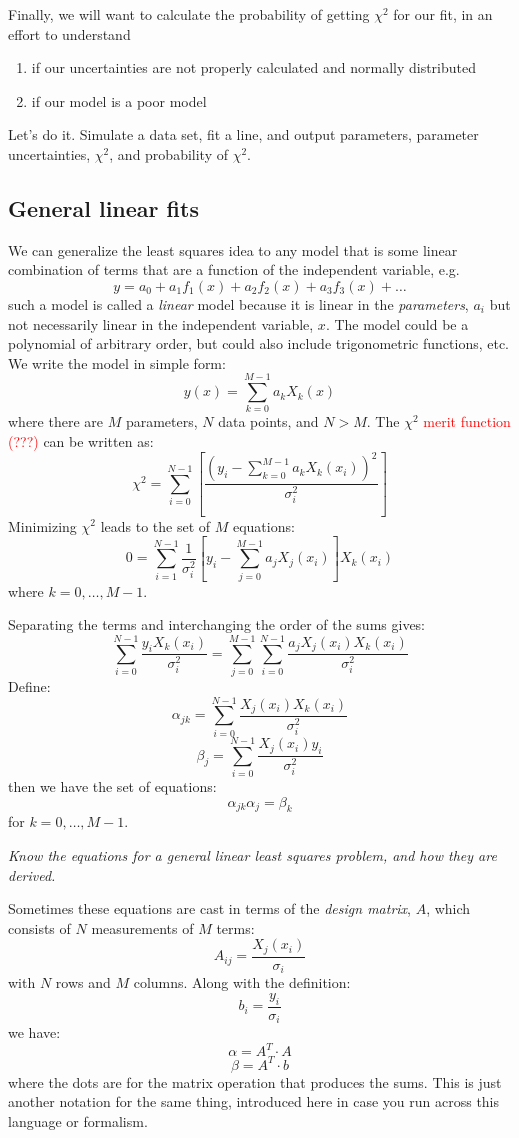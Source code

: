 \documentclass{article}
\newcommand{\test}[1]{%
    \begin{center}
        \colorbox{hl}{\parbox{0.9\textwidth}{\emph{\centering #1}}}
    \end{center}}
\begin{document}
Finally, we will want to calculate the probability of getting
$ \chi^{2}$ for our fit,
in an effort to understand
\begin{enumerate}
    \item if our uncertainties are not properly calculated and
        normally distributed
    \item if our model is a poor model
\end{enumerate}

Let's do it. Simulate a data set, fit a line, and output parameters, parameter
uncertainties, $\chi^2$, and probability of $\chi^2$.

\subsection{General linear fits}
We can generalize the least squares idea to any model that is some linear
combination of terms that are a function of the independent variable,
e.g.
$$ y = a_0 + a_1f_1(x) + a_2f_2(x) + a_3f_3(x) + \ldots
$$
such a model is called a \emph{linear} model because it is linear
in the \emph{parameters}, $a_{i}$ but not necessarily linear in the independent
variable, $x$. The model could be a polynomial of arbitrary order, but
could also include trigonometric functions, etc. We write the model
in simple form:
$$  y(x) = \sum_{k=0}^{M-1}a_kX_k(x)
$$
where there are $M$ parameters, $N$ data points, and $N>M$.
The $\chi^2$ \textcolor{red}{merit function (???)} can be written as:
$$ \chi^2 = \sum_{i=0}^{N-1} \left[
    \frac{(y_i - \sum_{k=0}^{M-1} a_{k}X_{k}(x_{i}))^{2}}
    {\sigma_{i}^{2}} \right]
$$
Minimizing $\chi^2$ leads to the set of $M$ equations:
$$ 0 = \sum_{i=1}^{N-1}\frac{1}{\sigma_i^2}
    \left[y_{i} - \sum_{j=0}^{M-1}a_{j}X_{j}(x_{i})\right]X_{k}(x_{i})
$$
where $k=0,\ldots,M-1$.

Separating the terms and interchanging the order of the sums gives:
$$  \sum_{i=0}^{N-1}\frac{y_{i}X_{k}(x_{i})}{\sigma_{i}^{2}} =
    \sum_{j=0}^{M-1}\sum_{i=0}^{N-1}\frac{a_{j}X_{j}(x_{i})X_{k}(x_{i})}{\sigma_{i}^{2}}
$$
Define:
$$ \alpha_{jk} = \sum_{i=0}^{N-1}\frac{X_{j}(x_{i})X_{k}(x_{i})}{\sigma_{i}^{2}}
$$
$$ \beta_{j} = \sum_{i=0}^{N-1}\frac{X_{j}(x_{i})y_{i}}{\sigma_{i}^{2}}
$$
then we have the set of equations:
$$ \alpha_{jk}\alpha_{j} = \beta_{k} $$
for $k=0,\ldots,M-1$.

\test{Know the equations for a general linear least squares
problem, and how they are derived.}

Sometimes these equations are cast in terms of the \emph{design matrix},
$A$, which consists of $N$ measurements of $M$ terms:
$$ A_{ij} = \frac{X_j(x_i)}{\sigma_i}
$$
with $N$ rows and $M$ columns. Along with the definition:
$$ b_i = \frac{y_i}{\sigma_i} $$
we have:
$$ \alpha = A^{T} \cdot A $$
$$ \beta = A^{T} \cdot b $$
where the dots are for the matrix operation that produces the sums.
This is just another notation for the same thing, introduced here in
case you run across this language or formalism.
\end{document}
